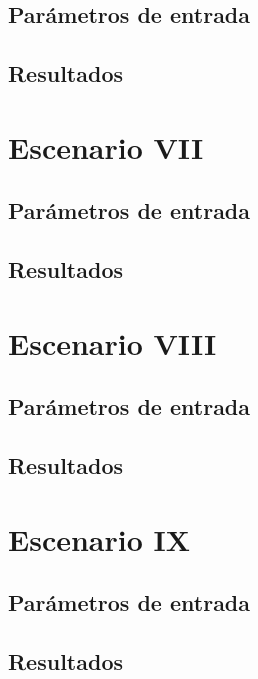 \subsection{Parámetros de entrada}
\subsection{Resultados}


\section{Escenario VII}
\subsection{Parámetros de entrada}
\subsection{Resultados}


\section{Escenario VIII}
\subsection{Parámetros de entrada}
\subsection{Resultados}


\section{Escenario IX}
\subsection{Parámetros de entrada}
\subsection{Resultados}